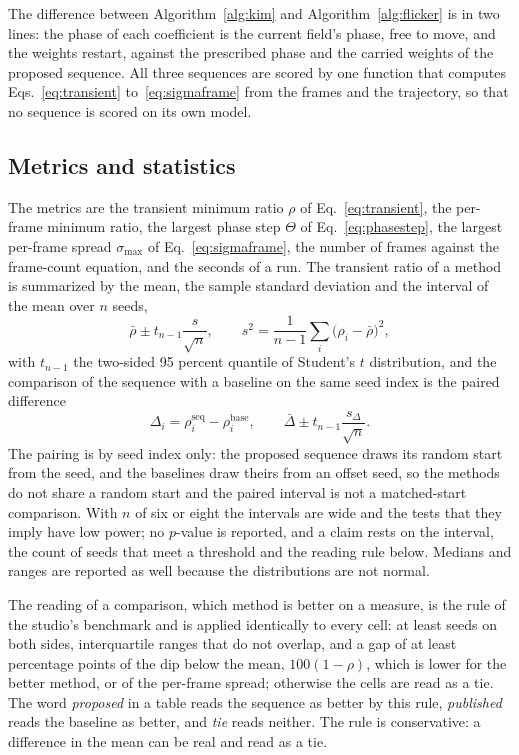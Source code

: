 The difference between Algorithm~\ref{alg:kim} and Algorithm~\ref{alg:flicker} is in two lines: the phase of each coefficient is the current field's phase, free to move, and the weights restart, against the prescribed phase and the carried weights of the proposed sequence. All three sequences are scored by one function that computes Eqs.~\ref{eq:transient} to~\ref{eq:sigmaframe} from the frames and the trajectory, so that no sequence is scored on its own model.

\subsection{Metrics and statistics}\label{sec:stats}

The metrics are the transient minimum ratio $\rho$ of Eq.~\ref{eq:transient}, the per-frame minimum ratio, the largest phase step $\Theta$ of Eq.~\ref{eq:phasestep}, the largest per-frame spread $\sigma_{\max}$ of Eq.~\ref{eq:sigmaframe}, the number of frames against the frame-count equation, and the seconds of a run. The transient ratio of a method is summarized by the mean, the sample standard deviation and the interval of the mean over $n$ seeds,
\begin{equation}
\bar\rho\pm t_{n-1}\frac{s}{\sqrt n},\qquad s^2=\frac1{n-1}\sum_i\big(\rho_i-\bar\rho\big)^2,\label{eq:ci}
\end{equation}
with $t_{n-1}$ the two-sided 95 percent quantile of Student's $t$ distribution, and the comparison of the sequence with a baseline on the same seed index is the paired difference
\begin{equation}
\Delta_i=\rho_i^{\mathrm{seq}}-\rho_i^{\mathrm{base}},\qquad \bar\Delta\pm t_{n-1}\frac{s_\Delta}{\sqrt n}.\label{eq:paired}
\end{equation}
The pairing is by seed index only: the proposed sequence draws its random start from the seed, and the baselines draw theirs from an offset seed, so the methods do not share a random start and the paired interval is not a matched-start comparison. With $n$ of six or eight the intervals are wide and the tests that they imply have low power; no $p$-value is reported, and a claim rests on the interval, the count of seeds that meet a threshold and the reading rule below. Medians and ranges are reported as well because the distributions are not normal.

The reading of a comparison, which method is better on a measure, is the rule of the studio's benchmark and is applied identically to every cell: at least \winMinSeeds{} seeds on both sides, interquartile ranges that do not overlap, and a gap of at least \winMinDiff{} percentage points of the dip below the mean, $100(1-\rho)$, which is lower for the better method, or of the per-frame spread; otherwise the cells are read as a tie. The word \emph{proposed} in a table reads the sequence as better by this rule, \emph{published} reads the baseline as better, and \emph{tie} reads neither. The rule is conservative: a difference in the mean can be real and read as a tie.

